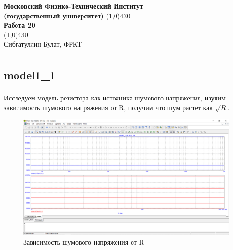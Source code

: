 \documentclass[a4paper, 12pt]{article}%
\begin{document}
\begin{titlepage}

\begin{center}
\large\textbf{Московский Физико-Технический Институт}\\
\large\textbf{(государственный университет)}
\vfill
\line(1,0){430}\\[1mm]
\huge\textbf{Работа 20}\\
\line(1,0){430}\\[1mm]
\vfill
\large Сибгатуллин Булат, ФРКТ\\
\end{center}

\end{titlepage}

\section{}

\subsection{\textbf{model1\_1}}

\subsubsection{}

Исследуем модель резистора как источника шумового напряжения, изучим зависимость шумового напряжения от R, получим что шум растет как $\sqrt{R}$.

\begin{figure}[h!]
    \centering
    \includegraphics[scale = 0.4 \textwidth]{images/mod1_1_1_2.png}
    \caption{Зависимость шумового напряжения от R}
    \label{fig:eR}
\end{figure}
\end{document}
